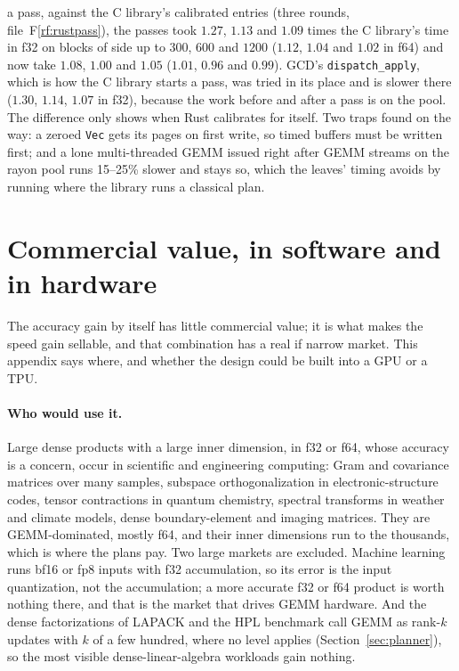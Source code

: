 \documentclass[11pt]{article}
\newcommand{\rf}[1]{F\ref{rf:#1}}
\begin{document}
a pass, against the C library's calibrated entries (three rounds,
file~\rf{rustpass}), the passes took $1.27$, $1.13$ and $1.09$ times the C
library's time in f32 on blocks of side up to $300$, $600$ and $1200$ ($1.12$,
$1.04$ and $1.02$ in f64) and now take $1.08$, $1.00$ and $1.05$ ($1.01$,
$0.96$ and $0.99$).  GCD's \texttt{dispatch\_apply}, which is how the C
library starts a pass, was tried in its place and is slower there ($1.30$,
$1.14$, $1.07$ in f32), because the work before and after a pass is on the
pool.  The difference only shows when Rust calibrates for itself.  Two traps
found on the way: a zeroed \texttt{Vec} gets its pages on first write, so
timed buffers must be written first; and a lone multi-threaded GEMM issued
right after GEMM streams on the rayon pool runs 15--25\% slower and stays so,
which the leaves' timing avoids by running where the library runs a
classical plan.

\section{Commercial value, in software and in hardware}\label{sec:value}

The accuracy gain by itself has little commercial value; it is what makes
the speed gain sellable, and that combination has a real if narrow market.  This appendix says where, and whether the design could be built into a GPU or
a TPU.

\paragraph{Who would use it.}
Large dense products with a large inner dimension, in f32 or f64, whose
accuracy is a concern, occur in scientific and engineering computing: Gram
and covariance matrices over many samples, subspace orthogonalization in
electronic-structure codes, tensor contractions in quantum chemistry,
spectral transforms in weather and climate models, dense boundary-element and
imaging matrices.  They are GEMM-dominated, mostly f64, and their inner
dimensions run to the thousands, which is where the plans pay.  Two large
markets are excluded.  Machine learning runs bf16 or fp8 inputs with f32
accumulation, so its error is the input quantization, not the accumulation;
a more accurate f32 or f64 product is worth nothing there, and that is the
market that drives GEMM hardware.  And the dense factorizations of LAPACK and
the HPL benchmark call GEMM as rank-$k$ updates with $k$ of a few hundred,
where no level applies (Section~\ref{sec:planner}), so the most visible
dense-linear-algebra workloads gain nothing.
\end{document}

